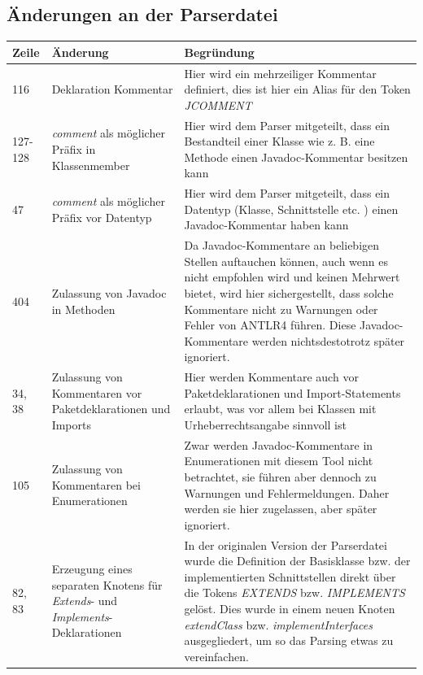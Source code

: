 
\renewcommand\appendixpagename{Anhänge}
\begin{appendices}


\chapter{Änderungen an der Parserdatei}
\begin{table}[h!]
    \centering
    \begin{tabular}{m{0.75cm}|m{4cm}|m{10cm}}
        \textbf{Zeile} & \textbf{Änderung} & \textbf{Begründung} \\
         \hline
        116 & Deklaration Kommentar & Hier wird ein mehrzeiliger Kommentar definiert, dies ist hier ein Alias für den Token \textit{JCOMMENT}\\
        \hline
        127-128 & \textit{comment} als möglicher Präfix in Klassenmember & Hier wird dem Parser mitgeteilt, dass ein Bestandteil einer Klasse wie z. B. eine Methode einen Javadoc-Kommentar besitzen kann\\
        \hline
        47 & \textit{comment} als möglicher Präfix vor Datentyp & Hier wird dem Parser mitgeteilt, dass ein Datentyp (Klasse, Schnittstelle etc. ) einen Javadoc-Kommentar haben kann \\
        \hline
        404 & Zulassung von Javadoc in Methoden & Da Javadoc-Kommentare an beliebigen Stellen auftauchen können, auch wenn es nicht empfohlen wird und keinen Mehrwert bietet, wird hier sichergestellt, dass solche Kommentare nicht zu Warnungen oder Fehler von ANTLR4 führen. Diese Javadoc-Kommentare werden nichtsdestotrotz später ignoriert.\\
        \hline
        34, 38& Zulassung von Kommentaren vor Paketdeklarationen und Imports & Hier werden Kommentare auch vor Paketdeklarationen und Import-Statements erlaubt, was vor allem bei Klassen mit Urheberrechtsangabe sinnvoll ist\\
        \hline
        105 & Zulassung von Kommentaren bei Enumerationen & Zwar werden Javadoc-Kommentare in Enumerationen mit diesem Tool nicht betrachtet, sie führen aber dennoch zu Warnungen und Fehlermeldungen. Daher werden sie hier zugelassen, aber später ignoriert. \\
        \hline
        82, 83 & Erzeugung eines separaten Knotens für \textit{Extends}- und \textit{Implements}-Deklarationen & In der originalen Version der Parserdatei wurde die Definition der Basisklasse bzw. der implementierten Schnittstellen direkt über die Tokens \textit{EXTENDS} bzw. \textit{IMPLEMENTS} gelöst. Dies wurde in einem neuen Knoten \textit{extendClass} bzw. \textit{implementInterfaces} ausgegliedert, um so das Parsing etwas zu vereinfachen.  \\
         

\end{tabular}
\end{table}
\end{appendices}
